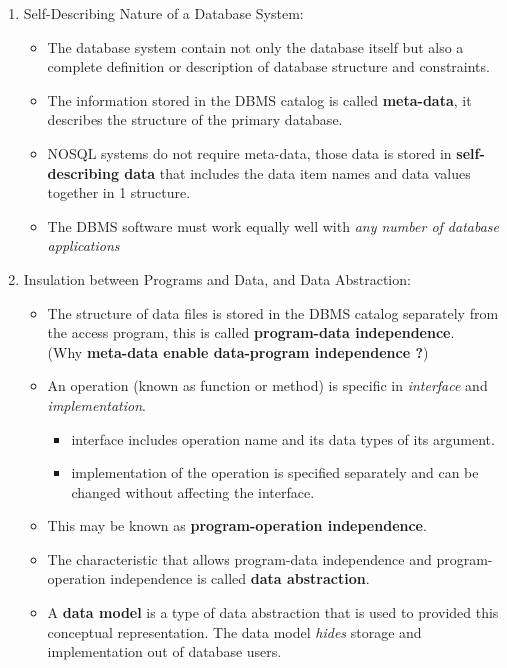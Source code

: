 \documentclass[10pt]{article}
\begin{document}
\begin{enumerate}
	\begin{enumerate}
		\item Self-Describing Nature of a Database System:
		\begin{itemize}
			\item The database system contain not only the database itself but also a complete definition or description of database structure and constraints.
			\item The information stored in the DBMS catalog is called \textbf{meta-data}, it describes the structure of the primary database.
			\item NOSQL systems do not require meta-data, those data is stored in \textbf{self-describing data} that includes the data item names and data values together in 1 structure.
			\item The DBMS software must work equally well with \textit{any number of database applications}
		\end{itemize}

		\item Insulation between Programs and Data, and Data Abstraction:
		\begin{itemize}
			\item The structure of data files is stored in the DBMS catalog separately from the access program, this is called \textbf{program-data independence}. \\
			(Why \textbf{meta-data enable data-program independence ?})
			\item An operation (known as function or method) is specific in \textit{interface} and \textit{implementation}.

			\begin{itemize}
				\item interface includes operation name and its data types of its argument.
				\item implementation of the operation is specified separately and can be changed without affecting the interface.
			\end{itemize}

			\item This may be known as \textbf{program-operation independence}.
			\item The characteristic that allows program-data independence and program-operation independence is called \textbf{data abstraction}.
			\item A \textbf{data model} is a type of data abstraction that is used to provided this conceptual representation. The data model \textit{hides} storage and implementation out of database users.  
		\end{itemize}


\end{enumerate}
\end{enumerate}
\end{document}
